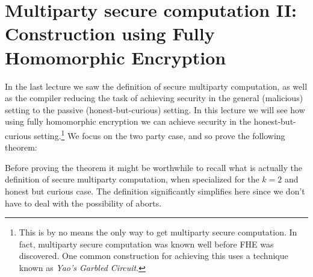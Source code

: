 \chapter{Multiparty secure computation II: Construction using Fully
Homomorphic Encryption}\label{sfetwochap}

In the last lecture we saw the definition of secure multiparty
computation, as well as the compiler reducing the task of achieving
security in the general (malicious) setting to the passive
(honest-but-curious) setting. In this lecture we will see how using
fully homomorphic encryption we can achieve security in the
honest-but-curious setting.\footnote{This is by no means the only way to
  get multiparty secure computation. In fact, multiparty secure
  computation was known well before FHE was discovered. One common
  construction for achieving this uses a technique known as \emph{Yao's
  Garbled Circuit}.} We focus on the two party case, and so prove the
following theorem:

\hypertarget{twopartympc}{}

Before proving the theorem it might be worthwhile to recall what is
actually the definition of secure multiparty computation, when
specialized for the \(k=2\) and honest but curious case. The definition
significantly simplifies here since we don't have to deal with the
possibility of aborts.

